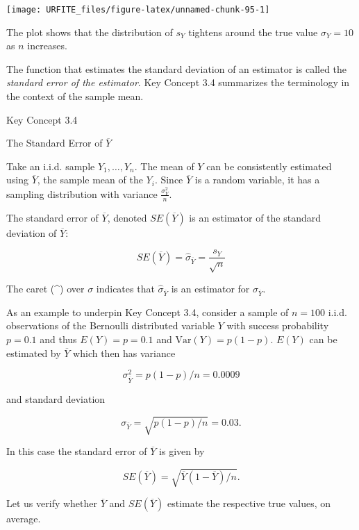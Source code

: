 \documentclass[]{book}
\theoremstyle{definition}
\theoremstyle{definition}
\theoremstyle{definition}
\theoremstyle{remark}
\begin{document}
\begin{center}\texttt{[image: URFITE\_files/figure-latex/unnamed-chunk-95-1]} \end{center}

The plot shows that the distribution of \(s_Y\) tightens around the true
value \(\sigma_Y = 10\) as \(n\) increases.

The function that estimates the standard deviation of an estimator is
called the \emph{standard error of the estimator}. Key Concept 3.4
summarizes the terminology in the context of the sample mean.

Key Concept 3.4

The Standard Error of \(\overline{Y}\)

Take an i.i.d. sample \(Y_1, \dots, Y_n\). The mean of \(Y\) can be
consistently estimated using \(\overline{Y}\), the sample mean of the
\(Y_i\). Since \(\overline{Y}\) is a random variable, it has a sampling
distribution with variance \(\frac{\sigma_Y^2}{n}\).

The standard error of \(\overline{Y}\), denoted \(SE(\overline{Y})\) is
an estimator of the standard deviation of \(\overline{Y}\):

\[ SE(\overline{Y}) = \hat\sigma_{\overline{Y}} = \frac{s_Y}{\sqrt{n}} \]

The caret (\^{}) over \(\sigma\) indicates that
\(\hat\sigma_{\overline{Y}}\) is an estimator for
\(\sigma_{\overline{Y}}\).

As an example to underpin Key Concept 3.4, consider a sample of
\(n=100\) i.i.d. observations of the Bernoulli distributed variable
\(Y\) with success probability \(p=0.1\) and thus \(E(Y)=p=0.1\) and
\(\text{Var}(Y)=p(1-p)\). \(E(Y)\) can be estimated by \(\overline{Y}\)
which then has variance

\[ \sigma^2_{\overline{Y}} = p(1-p)/n = 0.0009 \]

and standard deviation

\[ \sigma_{\overline{Y}} = \sqrt{p(1-p)/n} = 0.03. \]

In this case the standard error of \(\overline{Y}\) is given by

\[ SE(\overline{Y}) = \sqrt{\overline{Y}(1-\overline{Y})/n}. \]

Let us verify whether \(\overline{Y}\) and \(SE(\overline{Y})\) estimate
the respective true values, on average.
\end{document}
